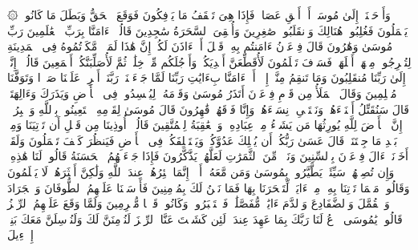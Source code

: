 ۞ وَأَوۡحَیۡنَاۤ إِلَىٰ مُوسَىٰۤ أَنۡ أَلۡقِ عَصَاكَۖ فَإِذَا هِیَ تَلۡقَفُ مَا یَأۡفِكُونَ%
\stopbuffer%
\startbuffer[\q:7:118]
فَوَقَعَ ٱلۡحَقُّ وَبَطَلَ مَا كَانُوا۟ یَعۡمَلُونَ%
\stopbuffer%
\startbuffer[\q:7:119]
فَغُلِبُوا۟ هُنَالِكَ وَٱنقَلَبُوا۟ صَٰغِرِینَ%
\stopbuffer%
\startbuffer[\q:7:120]
وَأُلۡقِیَ ٱلسَّحَرَةُ سَٰجِدِینَ%
\stopbuffer%
\startbuffer[\q:7:121]
قَالُوۤا۟ ءَامَنَّا بِرَبِّ ٱلۡعَٰلَمِینَ%
\stopbuffer%
\startbuffer[\q:7:122]
رَبِّ مُوسَىٰ وَهَٰرُونَ%
\stopbuffer%
\startbuffer[\q:7:123]
قَالَ فِرۡعَوۡنُ ءَامَنتُم بِهِۦ قَبۡلَ أَنۡ ءَاذَنَ لَكُمۡۖ إِنَّ هَٰذَا لَمَكۡرࣱ مَّكَرۡتُمُوهُ فِی ٱلۡمَدِینَةِ لِتُخۡرِجُوا۟ مِنۡهَاۤ أَهۡلَهَاۖ فَسَوۡفَ تَعۡلَمُونَ%
\stopbuffer%
\startbuffer[\q:7:124]
لَأُقَطِّعَنَّ أَیۡدِیَكُمۡ وَأَرۡجُلَكُم مِّنۡ خِلَٰفࣲ ثُمَّ لَأُصَلِّبَنَّكُمۡ أَجۡمَعِینَ%
\stopbuffer%
\startbuffer[\q:7:125]
قَالُوۤا۟ إِنَّاۤ إِلَىٰ رَبِّنَا مُنقَلِبُونَ%
\stopbuffer%
\startbuffer[\q:7:126]
وَمَا تَنقِمُ مِنَّاۤ إِلَّاۤ أَنۡ ءَامَنَّا بِءَایَٰتِ رَبِّنَا لَمَّا جَاۤءَتۡنَاۚ رَبَّنَاۤ أَفۡرِغۡ عَلَیۡنَا صَبۡرࣰا وَتَوَفَّنَا مُسۡلِمِینَ%
\stopbuffer%
\startbuffer[\q:7:127]
وَقَالَ ٱلۡمَلَأُ مِن قَوۡمِ فِرۡعَوۡنَ أَتَذَرُ مُوسَىٰ وَقَوۡمَهُۥ لِیُفۡسِدُوا۟ فِی ٱلۡأَرۡضِ وَیَذَرَكَ وَءَالِهَتَكَۚ قَالَ سَنُقَتِّلُ أَبۡنَاۤءَهُمۡ وَنَسۡتَحۡیِۦ نِسَاۤءَهُمۡ وَإِنَّا فَوۡقَهُمۡ قَٰهِرُونَ%
\stopbuffer%
\startbuffer[\q:7:128]
قَالَ مُوسَىٰ لِقَوۡمِهِ ٱسۡتَعِینُوا۟ بِٱللَّهِ وَٱصۡبِرُوۤا۟ۖ إِنَّ ٱلۡأَرۡضَ لِلَّهِ یُورِثُهَا مَن یَشَاۤءُ مِنۡ عِبَادِهِۦۖ وَٱلۡعَٰقِبَةُ لِلۡمُتَّقِینَ%
\stopbuffer%
\startbuffer[\q:7:129]
قَالُوۤا۟ أُوذِینَا مِن قَبۡلِ أَن تَأۡتِیَنَا وَمِنۢ بَعۡدِ مَا جِئۡتَنَاۚ قَالَ عَسَىٰ رَبُّكُمۡ أَن یُهۡلِكَ عَدُوَّكُمۡ وَیَسۡتَخۡلِفَكُمۡ فِی ٱلۡأَرۡضِ فَیَنظُرَ كَیۡفَ تَعۡمَلُونَ%
\stopbuffer%
\startbuffer[\q:7:130]
وَلَقَدۡ أَخَذۡنَاۤ ءَالَ فِرۡعَوۡنَ بِٱلسِّنِینَ وَنَقۡصࣲ مِّنَ ٱلثَّمَرَٰتِ لَعَلَّهُمۡ یَذَّكَّرُونَ%
\stopbuffer%
\startbuffer[\q:7:131]
فَإِذَا جَاۤءَتۡهُمُ ٱلۡحَسَنَةُ قَالُوا۟ لَنَا هَٰذِهِۦۖ وَإِن تُصِبۡهُمۡ سَیِّئَةࣱ یَطَّیَّرُوا۟ بِمُوسَىٰ وَمَن مَّعَهُۥۤۗ أَلَاۤ إِنَّمَا طَٰۤئِرُهُمۡ عِندَ ٱللَّهِ وَلَٰكِنَّ أَكۡثَرَهُمۡ لَا یَعۡلَمُونَ%
\stopbuffer%
\startbuffer[\q:7:132]
وَقَالُوا۟ مَهۡمَا تَأۡتِنَا بِهِۦ مِنۡ ءَایَةࣲ لِّتَسۡحَرَنَا بِهَا فَمَا نَحۡنُ لَكَ بِمُؤۡمِنِینَ%
\stopbuffer%
\startbuffer[\q:7:133]
فَأَرۡسَلۡنَا عَلَیۡهِمُ ٱلطُّوفَانَ وَٱلۡجَرَادَ وَٱلۡقُمَّلَ وَٱلضَّفَادِعَ وَٱلدَّمَ ءَایَٰتࣲ مُّفَصَّلَٰتࣲ فَٱسۡتَكۡبَرُوا۟ وَكَانُوا۟ قَوۡمࣰا مُّجۡرِمِینَ%
\stopbuffer%
\startbuffer[\q:7:134]
وَلَمَّا وَقَعَ عَلَیۡهِمُ ٱلرِّجۡزُ قَالُوا۟ یَٰمُوسَى ٱدۡعُ لَنَا رَبَّكَ بِمَا عَهِدَ عِندَكَۖ لَئِن كَشَفۡتَ عَنَّا ٱلرِّجۡزَ لَنُؤۡمِنَنَّ لَكَ وَلَنُرۡسِلَنَّ مَعَكَ بَنِیۤ إِسۡرَٰۤءِیلَ%
